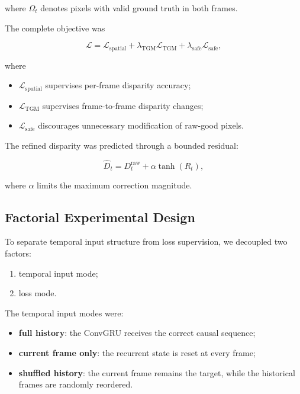 \documentclass[11pt,a4paper]{article}
\begin{document}
where $\Omega_t$ denotes pixels with valid ground truth in both frames.

The complete objective was

\begin{equation}
\mathcal{L}
=
\mathcal{L}_{\mathrm{spatial}}
+
\lambda_{\mathrm{TGM}}
\mathcal{L}_{\mathrm{TGM}}
+
\lambda_{\mathrm{safe}}
\mathcal{L}_{\mathrm{safe}},
\end{equation}

where

\begin{itemize}[leftmargin=*]
    \item $\mathcal{L}_{\mathrm{spatial}}$ supervises per-frame disparity accuracy;
    \item $\mathcal{L}_{\mathrm{TGM}}$ supervises frame-to-frame disparity changes;
    \item $\mathcal{L}_{\mathrm{safe}}$ discourages unnecessary modification of
    raw-good pixels.
\end{itemize}

The refined disparity was predicted through a bounded residual:

\begin{equation}
\hat{D}_t
=
D_t^{\mathrm{raw}}
+
\alpha
\tanh
\left(
R_t
\right),
\end{equation}

where $\alpha$ limits the maximum correction magnitude.

\subsection{Factorial Experimental Design}

To separate temporal input structure from loss supervision, we decoupled two
factors:

\begin{enumerate}[leftmargin=*]
    \item temporal input mode;
    \item loss mode.
\end{enumerate}

The temporal input modes were:

\begin{itemize}[leftmargin=*]
    \item \textbf{full history}: the ConvGRU receives the correct causal sequence;
    \item \textbf{current frame only}: the recurrent state is reset at every frame;
    \item \textbf{shuffled history}: the current frame remains the target, while the
    historical frames are randomly reordered.
\end{itemize}
\end{document}
